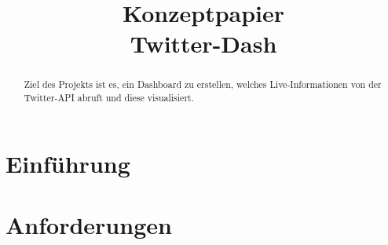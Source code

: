 \documentclass[conference]{IEEEtran}
\begin{document}
\title{Konzeptpapier\\Twitter-Dash}

\author{
        \and

        \and

        \and

        \and

        \and

}

\maketitle

\begin{abstract}
        Ziel des Projekts ist es, ein Dashboard zu erstellen, welches Live-Informationen von der Twitter-API abruft und diese visualisiert.
\end{abstract}


\section{Einführung}








\section{Anforderungen}
\end{document}
